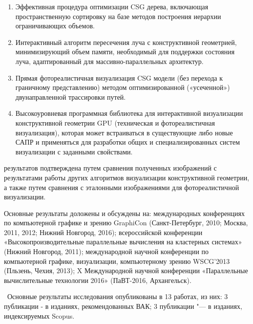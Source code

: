 {}
\begin{enumerate}
  \item Эффективная процедура оптимизации CSG дерева, включающая пространственную сортировку на базе методов построения иерархии ограничивающих объемов.
  \item Интерактивный алгоритм пересечения луча с конструктивной геометрией, минимизирующий объем памяти, необходимый для поддержки состояния луча, адаптированный для массивно-параллельных архитектур.
  \item Прямая фотореалистичная визуализация CSG модели (без перехода к граничному представлению) методом оптимизированной («усеченной») двунаправленной трассировки путей.
  \item Высокоуровневая программная библиотека для интерактивной визуализации конструктивной геометрии GPU (техническая и фотореалистичная визуализация), которая может встраиваться в существующие либо новые САПР и применяться для разработки общих и специализированных систем визуализации с заданными свойствами.
\end{enumerate} 

{\reliability} результатов подтверждена путем сравнения полученных изображений с результатами работы других алгоритмов визуализации конструктивной геометрии, а также путем сравнения с эталонными изображениями для фотореалистичной визуализации.

{\probation}
Основные результаты доложены и обсуждены на: международных конференциях по компьютерной графике и зрению GraphiCon (Санкт-Петербург, 2010; Москва, 2011, 2012;  Нижний Новгород, 2016); всероссийской конференции «Высокопроизводительные параллельные вычисления на кластерных системах» (Нижний Новгород, 2011); международной научной конференции по компьютерной графике, визуализации, компьютерному зрению WSCG'2013 (Пльзень, Чехия, 2013); X Международной научной конференции «Параллельные вычислительные технологии 2016» (ПаВТ-2016, Архангельск).



\publications\ Основные результаты исследования опубликованы в 13 работах, из них: 3 публикации - в изданиях, рекомендованных ВАК; 3 публикации "--- в изданиях, индексируемых Scopus.

